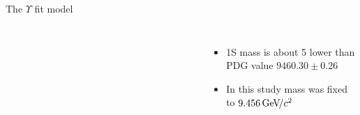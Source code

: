 \begin{frame}{The $\Upsilon$ fit model}
\begin{columns}
{\begin{tabular}{lrrr}

    \bottomrule
    \end{tabular}   
}

\bigskip

\begin{itemize}
\item \Y1S mass is about 5 \mevcc lower than PDG value $9460.30 \pm  0.26$ \mevcc
\item In this study \OneS mass was fixed to $9.456 {\mathrm{\,Ge\kern -0.1em V\!/}c^2}$ 
\end{itemize}
\end{columns}


\end{frame}

